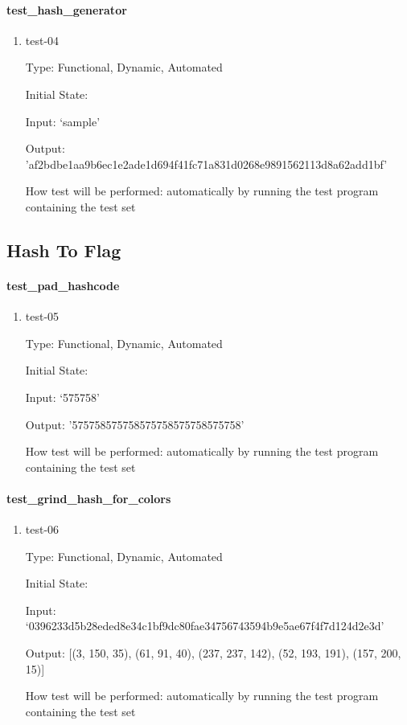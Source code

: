 \documentclass[12pt, titlepage]{article}
\begin{document}
\paragraph{test\_hash\_generator}

\begin{enumerate}

\item{test-04\\}

Type: Functional, Dynamic, Automated

Initial State:

Input: ‘sample'

Output: 'af2bdbe1aa9b6ec1e2ade1d694f41fc71a831d0268e9891562113d8a62add1bf'

How test will be performed: automatically by running the test program
containing the test set

\end{enumerate}

\subsection{Hash To Flag}

\paragraph{test\_pad\_hashcode}

\begin{enumerate}

\item{test-05\\}

Type: Functional, Dynamic, Automated

Initial State:

Input: ‘575758’

Output: '575758575758575758575758575758'

How test will be performed: automatically by running the test program
containing the test set

\end{enumerate}

\paragraph{test\_grind\_hash\_for\_colors}

\begin{enumerate}

\item{test-06\\}

Type: Functional, Dynamic, Automated

Initial State:

Input: ‘0396233d5b28eded8e34c1bf9dc80fae34756743594b9e5ae67f4f7d124d2e3d’

Output: [(3, 150, 35), (61, 91, 40), (237, 237, 142), (52, 193, 191), (157,
200, 15)]

How test will be performed: automatically by running the test program
containing the test set

\end{enumerate}
\end{document}
